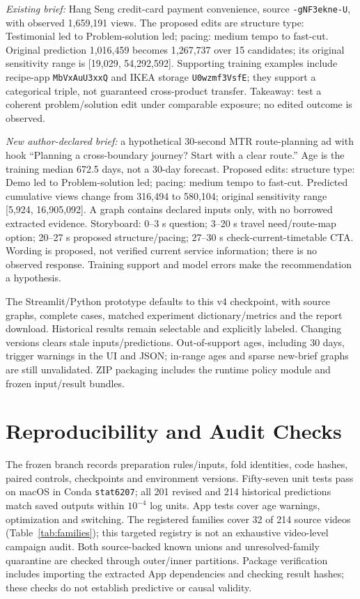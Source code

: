 \documentclass[a4paper,conference]{IEEEtran}
\begin{document}
\emph{Existing brief:} Hang Seng credit-card payment convenience, source \texttt{-gNF3ekne-U}, with observed 1,659,191 views. The proposed edits are structure type: Testimonial led to Problem-solution led; pacing: medium tempo to fast-cut. Original prediction 1,016,459 becomes 1,267,737 over 15 candidates; its original sensitivity range is [19,029, 54,292,592]. Supporting training examples include recipe-app \texttt{MbVxAuU3xxQ} and IKEA storage \texttt{U0wzmf3VsfE}; they support a categorical triple, not guaranteed cross-product transfer. Takeaway: test a coherent problem/solution edit under comparable exposure; no edited outcome is observed.

\emph{New author-declared brief:} a hypothetical 30-second MTR route-planning ad with hook ``Planning a cross-boundary journey? Start with a clear route.'' Age is the training median 672.5 days, not a 30-day forecast. Proposed edits: structure type: Demo led to Problem-solution led; pacing: medium tempo to fast-cut. Predicted cumulative views change from 316,494 to 580,104; original sensitivity range [5,924, 16,905,092]. A graph contains declared inputs only, with no borrowed extracted evidence. Storyboard: 0--3 s question; 3--20 s travel need/route-map option; 20--27 s proposed structure/pacing; 27--30 s check-current-timetable CTA. Wording is proposed, not verified current service information; there is no observed response. Training support and model errors make the recommendation a hypothesis.

The Streamlit/Python prototype defaults to this v4 checkpoint, with source graphs, complete cases, matched experiment dictionary/metrics and the report download. Historical results remain selectable and explicitly labeled. Changing versions clears stale inputs/predictions. Out-of-support ages, including 30 days, trigger warnings in the UI and JSON; in-range ages and sparse new-brief graphs are still unvalidated. ZIP packaging includes the runtime policy module and frozen input/result bundles.

\section{Reproducibility and Audit Checks}
The frozen branch records preparation rules/inputs, fold identities, code hashes, paired controls, checkpoints and environment versions. Fifty-seven unit tests pass on macOS in Conda \texttt{stat6207}; all 201 revised and 214 historical predictions match saved outputs within $10^{-4}$ log units. App tests cover age warnings, optimization and switching. The registered families cover 32 of 214 source videos (Table~\ref{tab:families}); this targeted registry is not an exhaustive video-level campaign audit. Both source-backed known unions and unresolved-family quarantine are checked through outer/inner partitions. Package verification includes importing the extracted App dependencies and checking result hashes; these checks do not establish predictive or causal validity.
\end{document}
